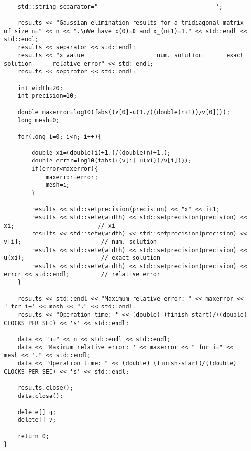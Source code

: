 \documentclass[a4paper, twoside, 11pt]{report}
\theoremstyle{theorem}
\theoremstyle{remark}
\theoremstyle{exemple}
\begin{document}
\begin{lstlisting}
    std::string separator="----------------------------------";

    results << "Gaussian elimination results for a tridiagonal matrix of size n=" << n << ".\nWe have x(0)=0 and x_(n+1)=1." << std::endl << std::endl;
    results << separator << std::endl;
    results << "x value                     num. solution       exact solution      relative error" << std::endl;
    results << separator << std::endl;

    int width=20;
    int precision=10;

    double maxerror=log10(fabs((v[0]-u(1./((double)n+1))/v[0])));
    long mesh=0;

    for(long i=0; i<n; i++){

        double xi=(double(i)+1.)/(double(n)+1.);
        double error=log10(fabs(((v[i]-u(xi))/v[i])));
        if(error<maxerror){
            maxerror=error;
            mesh=i;
        }

        results << std::setprecision(precision) << "x" << i+1;
        results << std::setw(width) << std::setprecision(precision) << xi;                        // xi
        results << std::setw(width) << std::setprecision(precision) << v[i];                       // num. solution
        results << std::setw(width) << std::setprecision(precision) << u(xi);                      // exact solution
        results << std::setw(width) << std::setprecision(precision) << error << std::endl;         // relative error
    }

    results << std::endl << "Maximum relative error: " << maxerror << " for i=" << mesh << "." << std::endl;
    results << "Operation time: " << (double) (finish-start)/((double) CLOCKS_PER_SEC) << 's' << std::endl;

    data << "n=" << n << std::endl << std::endl;
    data << "Maximum relative error: " << maxerror << " for i=" << mesh << "." << std::endl;
    data << "Operation time: " << (double) (finish-start)/((double) CLOCKS_PER_SEC) << 's' << std::endl;

    results.close();
    data.close();

    delete[] g;
    delete[] v;

    return 0;
}
\end{lstlisting}
\end{document}
